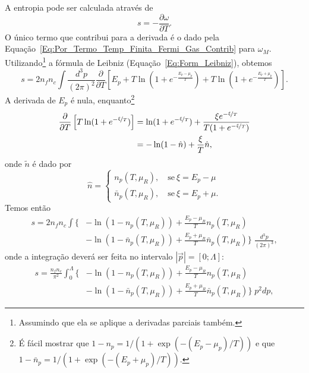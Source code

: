 A entropia pode ser calculada através de
\begin{equation}
	s = -\frac{\partial \omega}{\partial T}.
\end{equation}
%
O único termo que contribui para a derivada é o dado pela Equação~\eqref{Eq:Por_Termo_Temp_Finita_Fermi_Gas_Contrib} para $\omega_M$. Utilizando\footnote{Assumindo que ela se aplique a derivadas parciais também.} a fórmula de Leibniz (Equação~\eqref{Eq:Form_Leibniz}), obtemos
\begin{equation}
	s = 2 n_f n_c \int\frac{d^3p}{(2\pi)^2} \frac{\partial}{\partial T} \left[E_p + T \ln(1 + e^{-\frac{E_p - \mu_p}{T}}) + T \ln(1 + e^{-\frac{E_p + \mu_p}{T}})\right].
\end{equation}
%
A derivada de $E_p$ é nula, enquanto\footnote{É fácil mostrar que $1 - n_p = 1/(1 + \exp(-(E_p - \mu_p)/T))$ e que $1 - \bar{n}_p = 1/(1 + \exp(-(E_p + \mu_p)/T))$.}
\begin{align}
	\frac{\partial}{\partial T}\left[T \ln(1 + e^{-\nicefrac{\xi}{T}})\right] &= \ln (1 + e^{-\nicefrac{\xi}{T}}) + \frac{\xi e^{-\nicefrac{\xi}{T}}}{T(1+e^{-\nicefrac{\xi}{T}})} \\
	&= - \ln(1-\hat{n}) + \frac{\xi}{T}\hat{n},
\end{align}
%
onde $\tilde{n}$ é dado por
\begin{equation}
	\hat{n} = \begin{cases} n_p(T, \mu_R), \quad \textrm{se}~ \xi = E_p - \mu \\ \bar{n}_p(T, \mu_R), \quad \textrm{se}~ \xi = E_p + \mu. \end{cases}
\end{equation}
%
Temos então
\begin{equation}\label{Eq:Densidade_de_entropia_deriv}
\begin{split}
	s = 2 n_f n_c \int \Big\{&-\ln(1 - n_p(T, \mu_R)) + \frac{E_p - \mu_R}{T} n_p(T, \mu_R) \\
	&- \ln (1 - \bar{n}_p(T, \mu_R)) + \frac{E_p + \mu_R}{T} \bar{n}_p(T, \mu_R)\Big\} \; \frac{d^3p}{(2\pi)^3},
\end{split}
\end{equation}
%
onde a integração deverá ser feita no intervalo $|\vec{p}| = [0;\Lambda]$:
\begin{equation}
\begin{split}
	s = \frac{n_f n_c}{\pi^2} \int_0^\Lambda \Big\{&-\ln(1 - n_p(T, \mu_R)) + \frac{E_p - \mu_R}{T} n_p(T, \mu_R) \\
	&- \ln (1 - \bar{n}_p(T, \mu_R)) + \frac{E_p + \mu_R}{T} \bar{n}_p(T, \mu_R)\Big\} \; p^2 dp,
\end{split}
\end{equation}

